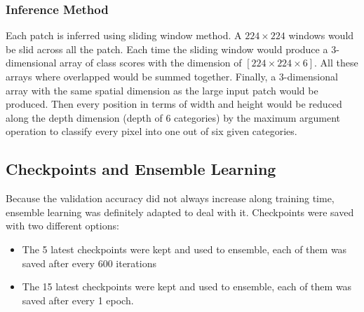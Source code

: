 \subsubsection{Inference Method}
Each patch is inferred using sliding window method. A $224 \times 224$ windows
would be slid across all the patch. Each time the sliding window would produce
a 3-dimensional array of class scores with the dimension of
$[224 \times 224 \times 6]$. All these arrays where overlapped would be summed
together. Finally, a 3-dimensional array with the same spatial dimension as the
large input patch would be produced. Then every position in terms of width and
height would be reduced along the depth dimension (depth of 6 categories) by the
maximum argument operation to classify every pixel into one out of six given
categories.

\subsection{Checkpoints and Ensemble Learning}
Because the validation accuracy did not always increase along training time,
ensemble learning was definitely adapted to deal with it. Checkpoints were
saved with two different options:
\begin{itemize}
    \item The 5 latest checkpoints were kept and used to ensemble, each of them
    was saved after every 600 iterations
    \item The 15 latest checkpoints were kept and used to ensemble, each of them
    was saved after every 1 epoch.
\end{itemize}
